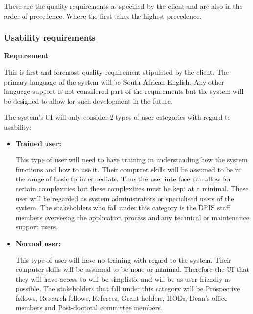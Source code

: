 These are the quality requirements as specified by the client and are also in the order of precedence. Where the first takes the highest precedence.

\subsubsection{Usability requirements}

\begin{flushleft}
\vspace{0.1in}

\textbf{Requirement}

This is first and foremost quality requirement stipulated by the client. The primary language of the system will be South African English. Any other language support is not considered part of the requirements but the system will be designed to allow for such development in the future.\\

\vspace{0.1in}

The system's UI will only consider 2 types of user categories with regard to usability:

\begin{itemize}

\item\textbf{Trained user:}

This type of user will need to have training in understanding how the system functions and how to use it. Their computer skills will be assumed to be in the range of basic to intermediate. Thus the user interface can allow for certain complexities but these complexities must be kept at a minimal. These user will be regarded as system administrators or specialised users of the system. The stakeholders who fall under this category is the DRIS staff members overseeing the application process and any technical or maintenance support users.

\item\textbf{Normal user:}

This type of user will have no training with regard to the system. Their computer skills will be assumed to be none or minimal. Therefore the UI that they will have access to will be simplistic and will be as user friendly as possible. The stakeholders that fall under this category will be Prospective fellows, Research fellows, Referees, Grant holders, HODs, Dean's office members and Post-doctoral committee members.

\end{itemize}


\end{flushleft}
